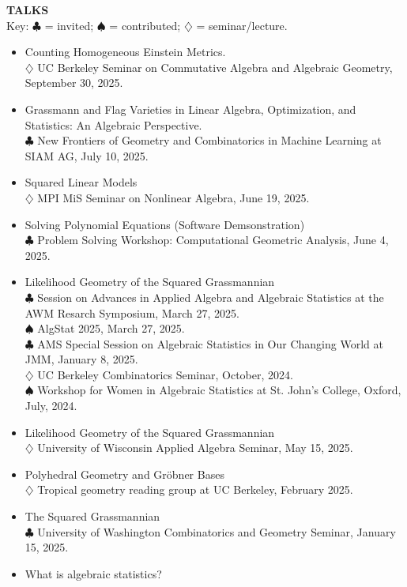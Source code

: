 \documentclass[11pt]{article}
\newcommand{\hdr}[1]{\textcolor{blue(ryb)}{\textbf{#1}}}
\begin{document}
\hdr{TALKS}\\
Key: $\clubsuit$ = invited; $\spadesuit$ = contributed; $\diamondsuit$ = seminar/lecture.
\begin{itemize}
\item Counting Homogeneous Einstein Metrics.\\
  $\diamondsuit$ UC Berkeley Seminar on Commutative Algebra and Algebraic Geometry, September 30, 2025. 
\item Grassmann and Flag Varieties in Linear Algebra, Optimization, and Statistics: An Algebraic Perspective.\\
  $\clubsuit$ New Frontiers of Geometry and Combinatorics in Machine Learning at SIAM AG, July 10, 2025.
\item Squared Linear Models\\
  $\diamondsuit$ MPI MiS Seminar on Nonlinear Algebra, June 19, 2025.
\item Solving Polynomial Equations (Software Demsonstration)\\
  $\clubsuit$  Problem Solving Workshop: Computational Geometric Analysis, June 4, 2025.
\item Likelihood Geometry of the Squared Grassmannian\\
  $\clubsuit$ Session on Advances in Applied Algebra and Algebraic Statistics at the AWM Resarch Symposium, March 27, 2025.\\    
  $\spadesuit$ AlgStat 2025, March 27, 2025.\\  
  $\clubsuit$ AMS Special Session on Algebraic Statistics in Our Changing World at JMM, January 8, 2025.\\
  $\diamondsuit$ UC Berkeley Combinatorics Seminar, October, 2024.\\
  $\spadesuit$ Workshop for Women in Algebraic Statistics at St. John's College, Oxford, July, 2024.
\item Likelihood Geometry of the Squared Grassmannian\\
  $\diamondsuit$ University of Wisconsin Applied Algebra Seminar, May 15, 2025.
\item Polyhedral Geometry and Gr\"{o}bner Bases\\
  $\diamondsuit$ Tropical geometry reading group at UC Berkeley, February 2025. 
\item The Squared Grassmannian\\
  $\clubsuit$ University of Washington Combinatorics and Geometry Seminar, January 15, 2025.
\item What is algebraic statistics?\\

\end{itemize}
\end{document}
